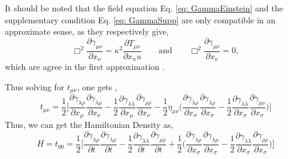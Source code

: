 \documentclass[12pt,a4paper]{report}
\theoremstyle{plain}
\theoremstyle{definition}
\theoremstyle{remark}
\newcommand{\mink}{\eta_{\mu\nu}}
\newcommand{\munu}{\mu\nu}
\begin{document}
It should be noted that the field equation Eq. \ref{eq: GammaEinstein} and the supplementary condition Eq. \ref{eq: GammaSupp} are only compatible in an approximate sense, as they respectively give,
\begin{equation}
    \Box^2\frac{\partial\gamma_{\munu}}{\partial x_{\nu}} = \kappa^2 \frac{\partial T_{\munu}}{\partial x_nu} \qquad \text{and} \qquad \Box^2\frac{\partial\gamma_{\munu}}{\partial x_{\nu}} =  0,
\end{equation}
which are agree in the first approximation \cite{Gupta_1952}.

Thus solving for $t_{\munu}$, one gets \cite{Gupta_1952},
\begin{equation}
    t_{\munu} = \frac{1}{2}\Bigg[\frac{\partial\gamma_{\lambda\rho}}{\partial x_{\mu}}\frac{\partial\gamma_{\lambda\rho}}{\partial x_{\nu}} - \frac{1}{2}\frac{\partial\gamma_{\lambda\lambda}}{\partial x_{\mu}}\frac{\partial\gamma_{\rho\rho}}{\partial x_{\nu}} - \frac{1}{2}\mink\Bigg(\frac{\partial\gamma_{\lambda\rho}}{\partial x_{\sigma}}\frac{\partial\gamma_{\lambda\rho}}{\partial x_{\sigma}} - \frac{1}{2}\frac{\partial\gamma_{\lambda\lambda}}{\partial x_{\sigma}}\frac{\partial\gamma_{\rho\rho}}{\partial x_{\sigma}}\Bigg)\Bigg]
    \label{eq: PseudoStEnergyDen3}
\end{equation}
Thus, we can get the Hamiltonian Density as,
\begin{equation}
    H = t_{00} = \frac{1}{2}\Bigg[\frac{\partial\gamma_{\lambda\rho}}{\partial t}\frac{\partial\gamma_{\lambda\rho}}{\partial t} - \frac{1}{2}\frac{\partial\gamma_{\lambda\lambda}}{\partial t}\frac{\partial\gamma_{\rho\rho}}{\partial t} + \frac{1}{2}\Bigg(\frac{\partial\gamma_{\lambda\rho}}{\partial x_{\sigma}}\frac{\partial\gamma_{\lambda\rho}}{\partial x_{\sigma}} - \frac{1}{2}\frac{\partial\gamma_{\lambda\lambda}}{\partial x_{\sigma}}\frac{\partial\gamma_{\rho\rho}}{\partial x_{\sigma}}\Bigg)\Bigg]
\end{equation}
\end{document}
